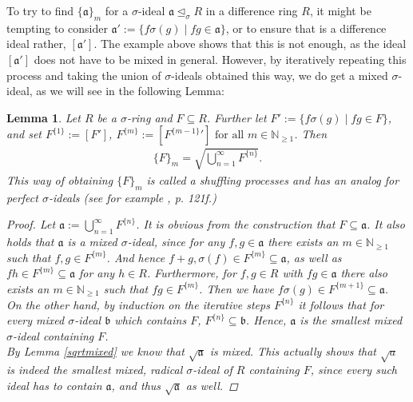 \documentclass{article}
\def\NE{\mathbb{N}_{\geq1}}
\def\a{\mathfrak{a}}
\def\b{\mathfrak{b}}
\def\s{\sigma}
\def\si{\unlhd_{\sigma}}
\def\fa{\text{ for all }}
\theoremstyle{plain}
\newtheorem{lem}[Satz]{Lemma}
\theoremstyle{definition}
\begin{document}
To try to find $\{\a\}_m$ for a $\s$-ideal $\a \si R$ in a difference ring $R$, it might be tempting to consider $\a':= \{ f\s(g) \mid fg \in \a \}$, or to ensure that is a difference ideal rather, $[\a']$. The example above shows that this is not enough,
as the ideal $[\a']$ does not have to be mixed in general. However, by iteratively repeating this process and taking the union of $\s$-ideals obtained this way, we do get a mixed $\s$-ideal, as we will see in the following Lemma:
\begin{lem}\label{lemshuffling}
Let $R$ be a $\s$-ring and $F \subseteq R$. Further let $F' := \{f\s(g) \mid fg \in F \}$, and set $F^{\{1\}}:= [F']$, $F^{\{m\}}:= [F^{\{m-1\}}'] \fa m \in \NE$. Then
\begin{align} \{F\}_m = \sqrt{\bigcup_{n=1}^{\infty} F^{\{n\}}}. \end{align}
This way of obtaining $\{F\}_m$ is called a shuffling processes and has an analog for perfect $\s$-ideals (see for example \cite{levin}, p. 121f.) 
\begin{proof}
Let $\a:= \bigcup_{n=1}^{\infty} F^{\{n\}}$. It is obvious from the construction that $F \subseteq \a$. It also holds that $\a$ is a mixed $\s$-ideal, since for any $f,g \in \a$ there exists an $m \in \NE$ such that $f,g \in F^{\{m\}}$.
And hence $f + g, \s(f) \in F^{\{m\}} \subseteq \a$, as well as $fh \in F^{\{m\}} \subseteq \a$ for any $h \in R$. Furthermore, for $f, g \in R$ with $fg \in \a$ there also exists an $m \in \NE$ such that $fg \in F^{\{m\}}$. 
Then we have $f\s(g) \in F^{\{m+1\}} \subseteq \a$. \\
\indent On the other hand, by induction on the iterative steps $F^{\{n\}}$ it follows that for every mixed $\s$-ideal $\b$ which contains $F$, $F^{\{n\}} \subseteq \b$. Hence, $\a$ is the smallest mixed $\s$-ideal containing $F$. \\
\indent By Lemma \ref{sqrtmixed} we know that $\sqrt{\a}$ is mixed. This actually shows that $\sqrt a$ is indeed the smallest mixed, radical $\s$-ideal of $R$ containing $F$, since every such ideal has to contain $\a$, and thus $\sqrt{\a}$ as well.

\end{proof}
\end{lem}
\end{document}
